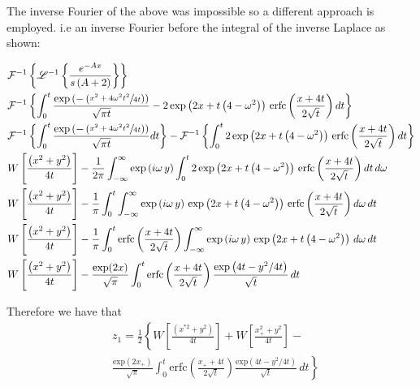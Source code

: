 \documentclass[10pt,a4,fleqn]{article}
\begin{document}
The inverse Fourier of the above was impossible so a different approach is employed. i.e an inverse Fourier before the integral of the inverse Laplace as shown:

\begin{equation}
\begin{aligned}
&\mathcal{F}^{-1}\left\{ \mathscr{L}^{-1}\left\{ \frac{e^{-Ax}}{s\left(A+2\right)}\right\} \right\} \\
 &\mathcal{F}^{-1}\left\{\int_0^t \frac{\mathrm{exp}\left(-\left( \sfrac{x^2 + 4\omega^2 t^2}{4t}\right)\right)}{\sqrt{\pi t}} -2\,\mathrm{exp}\left(2x + t\left(4 - \omega^2\right)\right)\, \mathrm{erfc}\left(\frac{x + 4t}{2\sqrt{t}}\right) dt \right\} \\ 
 &\mathcal{F}^{-1}\left\{\int_0^t \frac{\mathrm{exp}\left(-\left( \sfrac{x^2 + 4\omega^2 t^2}{4t}\right)\right)}{\sqrt{\pi t}}dt\right\} -\mathcal{F}^{-1}\left\{\int_0^t 2\,\mathrm{exp}\left(2x + t\left(4 - \omega^2\right)\right)\, \mathrm{erfc}\left(\frac{x + 4t}{2\sqrt{t}}\right) dt \right\} \\  
 &W\left[\frac{\left(x^2+ y^2\right)}{4t}\right] - \frac{1}{2\pi}\int_{-\infty}^{\infty}\mathrm{exp}\left(i\omega\,y\right) \int_0^t 2\,\mathrm{exp}\left(2x + t\left(4 - \omega^2\right)\right)\, \mathrm{erfc}\left(\frac{x + 4t}{2\sqrt{t}}\right) dt\, d\omega \\ 
&W\left[\frac{\left(x^2+ y^2\right)}{4t}\right] - \frac{1}{\pi}\int_0^t\int_{-\infty}^{\infty}\mathrm{exp}\left(i\omega\,y\right)  \,\mathrm{exp}\left(2x + t\left(4 - \omega^2\right)\right)\, \mathrm{erfc}\left(\frac{x + 4t}{2\sqrt{t}}\right)d\omega\, dt  \\ 
&W\left[\frac{\left(x^2+ y^2\right)}{4t}\right] - \frac{1}{\pi}\int_0^t\mathrm{erfc}\left(\frac{x + 4t}{2\sqrt{t}}\right)\int_{-\infty}^{\infty}\mathrm{exp}\left(i\omega\,y\right)  \,\mathrm{exp}\left(2x + t\left(4 - \omega^2\right)\right)\, d\omega\, dt  \\ 
&W\left[\frac{\left(x^2+ y^2\right)}{4t}\right] - \frac{\mathrm{exp}(2x)}{\sqrt{\pi}}\int_0^t\mathrm{erfc}\left(\frac{x + 4t}{2\sqrt{t}}\right) \frac{\mathrm{exp}\left(4t - y^2/4t\right)}{\sqrt{t}}\,dt
\end{aligned}
\end{equation}

Therefore we have that
\begin{equation}
\begin{aligned}
    &{z}_1 = \frac{1}{2} \left\{ W\left[\frac{\left(x^{*2}+ y^2\right)}{4t}\right] + W\left[\frac{x_+^2+ y^2}{4t}\right] - \right . \\  & \left . \frac{\mathrm{exp}(2x_+)}{\sqrt{\pi}}\int_0^t\mathrm{erfc}\left(\frac{x_+ + 4t}{2\sqrt{t}}\right) \frac{\mathrm{exp}\left(4t - y^2/4t\right)}{\sqrt{t}}\,dt \right \}
\end{aligned}
\end{equation}
\end{document}
